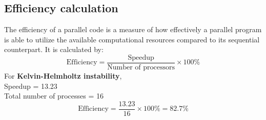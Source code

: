 \subsection{Efficiency calculation}
The efficiency of a parallel code is a measure of how effectively a parallel program is able to utilize the available computational resources compared to its sequential counterpart. It is calculated by:
\begin{equation*}
    \text{Efficiency} = \frac{\text{Speedup}}{\text{Number of processors}} \times 100 \%
\end{equation*}
For \textbf{Kelvin-Helmholtz instability},\\
Speedup = 13.23\\
Total number of processes = 16
\begin{equation*}
    \text{Efficiency} = \frac{13.23}{16} \times 100 \% = 82.7 \%   
\end{equation*}
